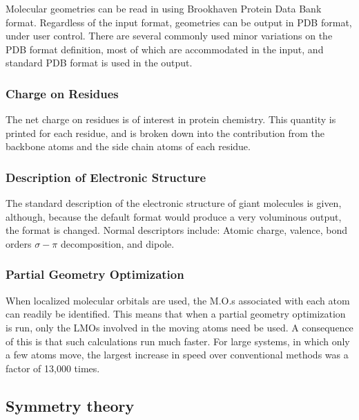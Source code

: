 Molecular geometries can be read in using Brookhaven Protein Data Bank
format.  Regardless of the input format, geometries can be output in PDB
format, under user control.  There are several commonly used minor variations
on the PDB format definition,  most of which are accommodated in the input,
and standard PDB format is used in the output.

\subsubsection*{Charge on Residues}

The net charge on residues is of interest in protein chemistry.  This quantity
is  printed for each residue, and is broken down into the contribution from
the  backbone atoms and the side chain atoms of each residue.

\subsubsection*{Description of Electronic Structure}

The standard description of the electronic structure of giant molecules is given,
although, because the default format would produce a very voluminous output,
the format is changed.  Normal descriptors include: Atomic charge, valence,
bond orders $\sigma - \pi$ decomposition, and dipole.

\subsubsection*{Partial Geometry Optimization}

When localized molecular orbitals are used, the M.O.s associated with each
atom can readily be identified.  This means that when a partial geometry
optimization is run, only the LMOs involved in the moving atoms need be used.
A consequence of this is that such calculations run much faster.  For large
systems, in which only a few atoms move, the largest increase in speed over
conventional methods was a factor of 13,000 times.

\subsection{Symmetry theory}

